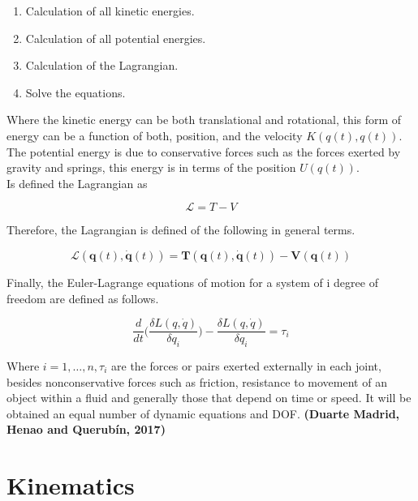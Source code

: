 \documentclass{UoNMCHA}
\numberwithin{equation}{section}
\begin{document}
	\begin{enumerate}
		\item Calculation of all kinetic energies.
		\item Calculation of all potential energies.
		\item Calculation of the Lagrangian.
		\item Solve the equations.
		
	\end{enumerate}
	
	Where the kinetic energy can be both translational and rotational, this form of energy can be a function of both, position, and the velocity $K(q(t), q(t))$. \\
	The potential energy is due to conservative forces such as the forces exerted by gravity and springs, this energy is in terms of the position $U(q(t))$. \\
	Is defined the Lagrangian as
	
	\begin{equation}
	\mathcal{L}=T-V
	\end{equation}
	
	Therefore, the Lagrangian is defined of the following in general terms.
	
	\begin{equation}
	\mathcal{L}(\boldsymbol{q}(t), \dot{\boldsymbol{q}}(t))=\boldsymbol{T}(\boldsymbol{q}(t), \dot{\boldsymbol{q}}(t))-\boldsymbol{V}(\boldsymbol{q}(t))
	\end{equation}
	
	Finally, the Euler-Lagrange equations of motion for a system of i degree of freedom are defined as follows.
	
	\begin{equation}
	\frac{d}{dt}\big(  \frac{\delta L(q,\dot{q})}{\delta q_{i}} \big) -\frac{\delta L(q,\dot{q})}{\delta q_i}=\tau_i
	\end{equation}
	
	
	Where $i=1,\ldots,n,\tau_i$ are the forces or pairs exerted externally in each joint, besides nonconservative forces such as friction, resistance to movement of an object within a fluid and generally those that depend on time or speed. It will be obtained an equal number of dynamic equations and DOF. \textbf{(Duarte Madrid, Henao and Querubín, 2017)}
	
	\section{Kinematics}
	
\end{document}
